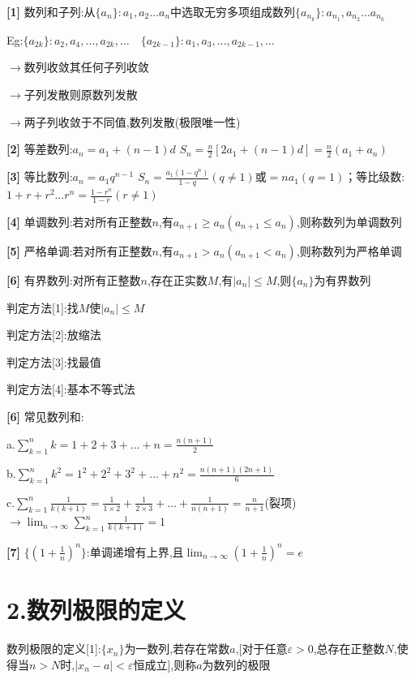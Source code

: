 \documentclass[11pt,a4paper,UTF8]{ctexart}
\begin{document}
\begin{thmbox}[2.数列的性质]

\textbf{[1]} 数列和子列:从$\{a_n\}: a_1, a_2 \dots a_n$中选取无穷多项组成数列$\{a_{n_k}\}: a_{n_1}, a_{n_2} \dots a_{n_k}$

	     Eg:$\{a_{2k}\}: a_2, a_4, \dots, a_{2k}, \dots \quad \{a_{2k-1}\}: a_1, a_3, \dots, a_{2k-1}, \dots$

	  $\to$数列收敛其任何子列收敛

	  $\to$子列发散则原数列发散

	  $\to$两子列收敛于不同值,数列发散(极限唯一性)

\textbf{[2]} 等差数列:$a_n = a_1 +(n-1)d$	$S_n = \frac{n}{2}[2a_1 +(n-1)d] = \frac{n}{2}(a_1 + a_n)$

\textbf{[3]} 等比数列:$a_n = a_1 q^{n-1}$	  $S_n = \frac{a_1(1-q^n)}{1-q}(q \neq 1)$或$= na_1(q=1)$；等比级数:$1+r+r^2 \dots r^n = \frac{1-r^n}{1-r}(r \neq 1)$

\textbf{[4]} 单调数列:若对所有正整数$n$,有$a_{n+1} \ge a_n(a_{n+1} \le a_n)$,则称数列为单调数列

\textbf{[5]} 严格单调:若对所有正整数$n$,有$a_{n+1} > a_n(a_{n+1} < a_n)$,则称数列为严格单调

\textbf{[6]} 有界数列:对所有正整数$n$,存在正实数$M$,有$|a_n| \le M$,则$\{a_n\}$为有界数列

    	判定方法[1]:找$M$使$|a_n| \le M$

    	判定方法[2]:放缩法  

    	判定方法[3]:找最值  

    	判定方法[4]:基本不等式法

\textbf{[6]} 常见数列和:

  a.$\sum_{k=1}^n k = 1+2+3+\dots+n = \frac{n(n+1)}{2}$

  b.$\sum_{k=1}^n k^2 = 1^2+2^2+3^2+\dots+n^2 = \frac{n(n+1)(2n+1)}{6}$

  c.$\sum_{k=1}^n \frac{1}{k(k+1)} = \frac{1}{1 \times 2} + \frac{1}{2 \times 3} + \dots + \frac{1}{n(n+1)} = \frac{n}{n+1}$(裂项)$\to \lim_{n \to \infty} \sum_{k=1}^n \frac{1}{k(k+1)} = 1$

\textbf{[7]} $\{(1+\frac{1}{n})^n\}$:单调递增有上界,且$\lim_{n \to \infty}(1+\frac{1}{n})^n = e$

\end{thmbox}

\section{2.数列极限的定义}
数列极限的定义[1]:$\{x_n\}$为一数列,若存在常数$a$,[对于任意$\varepsilon > 0$,总存在正整数$N$,使得当$n > N$时,$|x_n - a| < \varepsilon$恒成立],则称$a$为数列的极限
\end{document}
